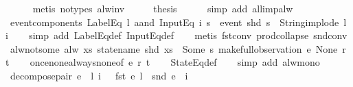 \begin{isabellebody}
\ \ \ \ \isamarkupfalse%
\ {\isacharparenleft}metis\ {\isacharparenleft}no{\isacharunderscore}types{\isacharparenright}\ alw{\isacharunderscore}inv{\isacharparenright}\isanewline
\ \ \isamarkupfalse%
\ \isamarkupfalse%
\ {\isacharquery}thesis\isanewline
\ \ \ \ \isamarkupfalse%
\ {\isacharparenleft}simp\ add{\isacharcolon}\ all{\isacharunderscore}imp{\isacharunderscore}alw{\isacharparenright}\isanewline
{}\isamarkupfalse%
%
\endisatagproof
{\isafoldproof}%
%
\isadelimproof
\isanewline
%
\endisadelimproof
\isanewline
{}\isamarkupfalse%
\ event{\isacharunderscore}components{\isacharcolon}\ {\isachardoublequoteopen}{\isacharparenleft}LabelEq\ l\ aand\ InputEq\ i{\isacharparenright}\ s\ {\isacharequal}\ {\isacharparenleft}event\ {\isacharparenleft}shd\ s{\isacharparenright}\ {\isacharequal}\ {\isacharparenleft}String{\isachardot}implode\ l{\isacharcomma}\ i{\isacharparenright}{\isacharparenright}{\isachardoublequoteclose}\isanewline
%
\isadelimproof
\ \ %
\endisadelimproof
%
\isatagproof
{}\isamarkupfalse%
\ {\isacharparenleft}simp\ add{\isacharcolon}\ LabelEq{\isacharunderscore}def\ InputEq{\isacharunderscore}def{\isacharparenright}\isanewline
\ \ \isamarkupfalse%
\ {\isacharparenleft}metis\ fst{\isacharunderscore}conv\ prod{\isachardot}collapse\ snd{\isacharunderscore}conv{\isacharparenright}%
\endisatagproof
{\isafoldproof}%
%
\isadelimproof
\isanewline
%
\endisadelimproof
\isanewline
{}\isamarkupfalse%
\ alw{\isacharunderscore}not{\isacharunderscore}some{\isacharcolon}\ {\isachardoublequoteopen}alw\ {\isacharparenleft}{\isasymlambda}xs{\isachardot}\ statename\ {\isacharparenleft}shd\ xs{\isacharparenright}\ {\isasymnoteq}\ Some\ s{\isacharparenright}\ {\isacharparenleft}make{\isacharunderscore}full{\isacharunderscore}observation\ e\ None\ r\ t{\isacharparenright}{\isachardoublequoteclose}\isanewline
%
\isadelimproof
\ \ %
\endisadelimproof
%
\isatagproof
{}\isamarkupfalse%
\ once{\isacharunderscore}none{\isacharunderscore}always{\isacharunderscore}none{\isacharbrackleft}of\ e\ r\ t{\isacharbrackright}\isanewline
\ \ \isamarkupfalse%
\ StateEq{\isacharunderscore}def\isanewline
\ \ \isamarkupfalse%
\ {\isacharparenleft}simp\ add{\isacharcolon}\ alw{\isacharunderscore}mono{\isacharparenright}%
\endisatagproof
{\isafoldproof}%
%
\isadelimproof
\isanewline
%
\endisadelimproof
\isanewline
{}\isamarkupfalse%
\ decompose{\isacharunderscore}pair{\isacharcolon}\ {\isachardoublequoteopen}e\ {\isasymnoteq}\ {\isacharparenleft}l{\isacharcomma}\ i{\isacharparenright}\ {\isacharequal}\ {\isacharparenleft}{\isasymnot}\ {\isacharparenleft}fst\ e\ {\isacharequal}l\ {\isasymand}\ snd\ e\ {\isacharequal}\ i{\isacharparenright}{\isacharparenright}{\isachardoublequoteclose}\isanewline

\end{isabellebody}
